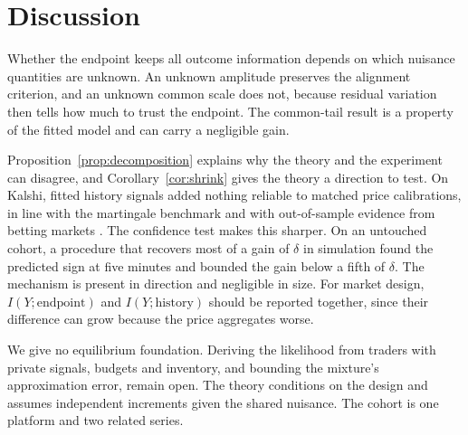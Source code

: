 \documentclass[runningheads]{llncs}
\begin{document}
\section{Discussion}
\label{sec:discussion}
Whether the endpoint keeps all outcome information depends on which nuisance quantities are unknown. An unknown amplitude preserves the alignment criterion, and an unknown common scale does not, because residual variation then tells how much to trust the endpoint. The common-tail result is a property of the fitted model and can carry a negligible gain.

Proposition~\ref{prop:decomposition} explains why the theory and the experiment can disagree, and Corollary~\ref{cor:shrink} gives the theory a direction to test. On Kalshi, fitted history signals added nothing reliable to matched price calibrations, in line with the martingale benchmark and with out-of-sample evidence from betting markets \cite{richard2021efficiency}. The confidence test makes this sharper. On an untouched cohort, a procedure that recovers most of a gain of $\delta$ in simulation found the predicted sign at five minutes and bounded the gain below a fifth of $\delta$. The mechanism is present in direction and negligible in size. For market design, $I(Y;\text{endpoint})$ and $I(Y;\text{history})$ should be reported together, since their difference can grow because the price aggregates worse.

We give no equilibrium foundation. Deriving the likelihood from traders with private signals, budgets and inventory, and bounding the mixture's approximation error, remain open. The theory conditions on the design and assumes independent increments given the shared nuisance. The cohort is one platform and two related series.




\appendix







\end{document}
